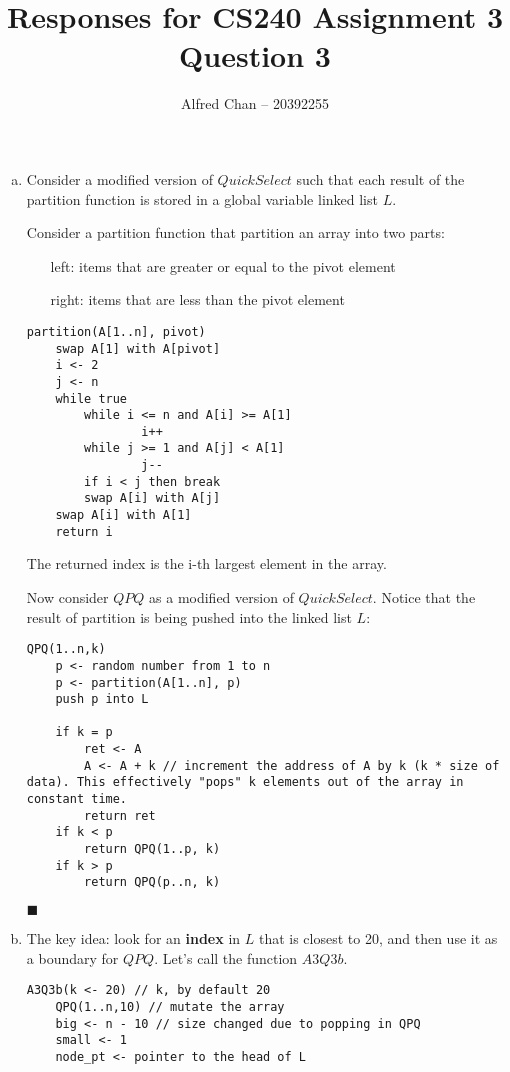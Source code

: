 \documentclass[12pt]{article}
\title{Responses for CS240 Assignment 3 Question 3}
\author{Alfred Chan -- 20392255}
\begin{document}

\maketitle
\begin{enumerate}[(a)]
\item Consider a modified version of $QuickSelect$ such that each result of the partition function is stored in a global variable linked list $L$.

Consider a partition function that partition an array into two parts:
\begin{itemize}
\item[left:] items that are greater or equal to the pivot element
\item[right:] items that are less than the pivot element
\end{itemize}
\begin{lstlisting}
partition(A[1..n], pivot)
	swap A[1] with A[pivot]
	i <- 2
	j <- n
	while true
		while i <= n and A[i] >= A[1]
				i++
		while j >= 1 and A[j] < A[1]
				j--
		if i < j then break
		swap A[i] with A[j]
	swap A[i] with A[1]
	return i
\end{lstlisting}
The returned index is the i-th largest element in the array.

Now consider $QPQ$ as a modified version of $QuickSelect$.
Notice that the result of partition is being pushed into the linked list $L$:

\begin{lstlisting}
QPQ(1..n,k)
	p <- random number from 1 to n
	p <- partition(A[1..n], p)
	push p into L
	
	if k = p
		ret <- A
		A <- A + k // increment the address of A by k (k * size of data). This effectively "pops" k elements out of the array in constant time.
		return ret
	if k < p
		return QPQ(1..p, k)
	if k > p
		return QPQ(p..n, k)
\end{lstlisting}
\hfill $\blacksquare$

\item
The key idea: look for an {\bf index} in $L$ that is closest to 20, and then use it as a boundary for $QPQ$.
Let's call the function $A3Q3b$.
\begin{lstlisting}
A3Q3b(k <- 20) // k, by default 20
	QPQ(1..n,10) // mutate the array
	big <- n - 10 // size changed due to popping in QPQ
	small <- 1
	node_pt <- pointer to the head of L


\end{lstlisting}
\end{enumerate}
\end{document}
